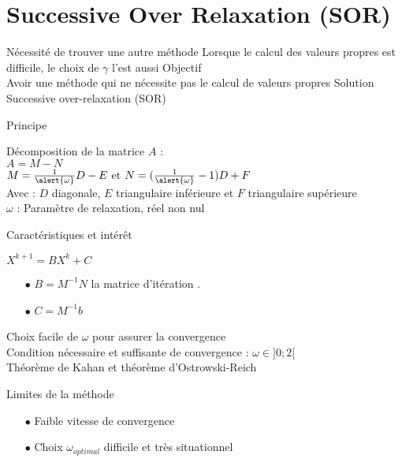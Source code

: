 \documentclass[10pt]{beamer}
\begin{document}
\section{Successive Over Relaxation (SOR)}
\begin{frame}{Nécessité de trouver une autre méthode}
	Lorsque le calcul des valeurs propres est difficile, le choix de $\gamma$ l'est aussi\pause
	\vspace{1cm}
	\alert{Objectif} \\
	\centering Avoir une méthode qui ne nécessite pas le calcul de valeurs propres
	\vspace{1cm}
	\flushleft
	\alert{Solution} \\
	\centering Successive over-relaxation (SOR)
\end{frame}
\begin{frame}{Principe}
	\begin{center}
		Décomposition de la matrice $A$ :\\
		$A=M-N$\\\pause
		$M=\frac{1}{\alert{\omega}}D-E$ et $N=(\frac{1}{\alert{\omega}}-1)D+F$\\
		Avec : $D$ diagonale, $E$ triangulaire inférieure et $F$ triangulaire supérieure \pause\\
		\alert{$\omega$} : Paramètre de relaxation, réel non nul
	\end{center}
\end{frame}
\begin{frame}{Caractéristiques et intérêt}
	\begin{center}
		$X^{k+1}=BX^k+C$
	\end{center}
\begin{itemize}
	\item[$\bullet$] $B=M^{-1}N$ la matrice d'itération .
	\item[$\bullet$] $C=M^{-1}b$ 
\end{itemize}\pause
\centering Choix facile de $\omega$ pour assurer la \alert{convergence}\pause\\
Condition nécessaire et suffisante de convergence : $\omega \in ]0;2[$\pause \\
\footnotesize Théorème de \alert{Kahan} et théorème d'\alert{Ostrowski-Reich}
\end{frame}
\begin{frame}{Limites de la méthode}
\begin{itemize}
	\item[$\bullet$]Faible vitesse de convergence
	
	\item[$\bullet$]Choix $\omega_{optimal}$ difficile et très situationnel
\end{itemize}
	
\end{frame}
\end{document}
